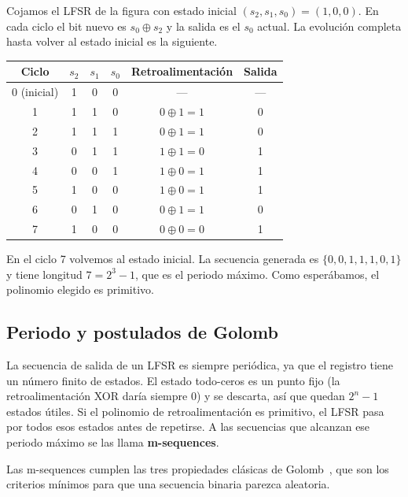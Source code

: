 \begin{ejemplo}
Cojamos el LFSR de la figura con estado inicial $(s_2, s_1, s_0) = (1, 0, 0)$. En cada ciclo el bit nuevo es $s_0 \oplus s_2$ y la salida es el $s_0$ actual.
La evolución completa hasta volver al estado inicial es la siguiente.

\begin{center}
\begin{tabular}{cccccc}
\hline
\textbf{Ciclo} & \textbf{$s_2$} & \textbf{$s_1$} & \textbf{$s_0$} &
\textbf{Retroalimentación} & \textbf{Salida} \\
\hline
0 (inicial) & 1 & 0 & 0 & --- & --- \\
1 & 1 & 1 & 0 & $0 \oplus 1 = 1$ & 0 \\
2 & 1 & 1 & 1 & $0 \oplus 1 = 1$ & 0 \\
3 & 0 & 1 & 1 & $1 \oplus 1 = 0$ & 1 \\
4 & 0 & 0 & 1 & $1 \oplus 0 = 1$ & 1 \\
5 & 1 & 0 & 0 & $1 \oplus 0 = 1$ & 1 \\
6 & 0 & 1 & 0 & $0 \oplus 1 = 1$ & 0 \\
7 & 1 & 0 & 0 & $0 \oplus 0 = 0$ & 1 \\
\hline
\end{tabular}
\end{center}

En el ciclo 7 volvemos al estado inicial. La secuencia generada es $\{0, 0, 1, 1, 1, 0, 1\}$ y tiene longitud $7 = 2^3 - 1$,
que es el periodo máximo. Como esperábamos, el polinomio elegido es primitivo.
\end{ejemplo}

\subsection{Periodo y postulados de Golomb}

La secuencia de salida de un LFSR es siempre periódica, ya que el registro tiene un número finito de estados.
El estado todo-ceros es un punto fijo (la retroalimentación XOR daría siempre 0) y se descarta, así que quedan $2^n - 1$ estados útiles.
Si el polinomio de retroalimentación es primitivo, el LFSR pasa por todos esos estados antes de repetirse.
A las secuencias que alcanzan ese periodo máximo se las llama \textbf{m-sequences}.

Las m-sequences cumplen las tres propiedades clásicas de Golomb~\cite{golomb1967}, que son los criterios mínimos para que una secuencia binaria parezca aleatoria.

